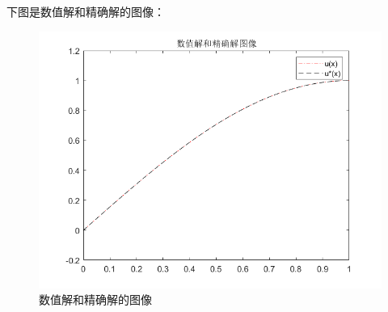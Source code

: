 \documentclass{article}
\begin{document}
下图是数值解和精确解的图像：
\begin{figure}[H]
\centering
\includegraphics[scale=0.5]{中心差分和有限体积法的中矩形公式/solution_2.png}
\caption{\label{solution_image}数值解和精确解的图像}
\end{figure}
\end{document}
